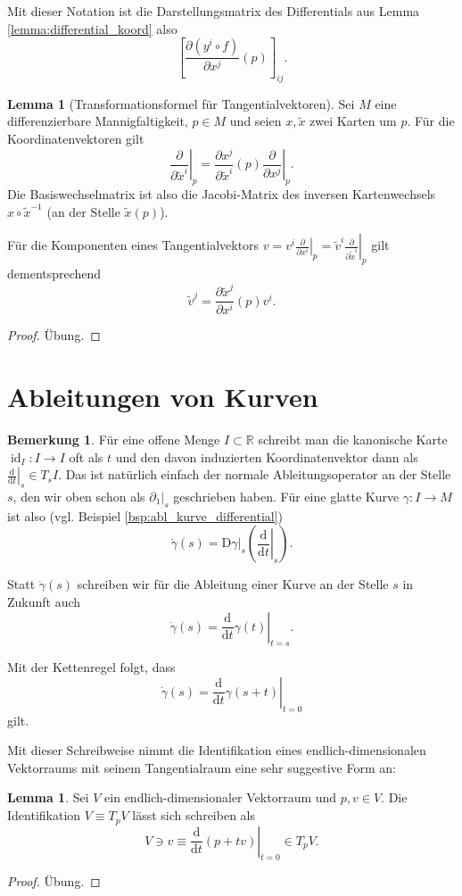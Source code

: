 \documentclass[a4paper]{scrbook}
\numberwithin{equation}{chapter}
\newcommand{\D}{\mathrm{d}}
\newcommand{\DD}{\mathrm{D}}
\DeclareMathOperator{\id}{id}
\theoremstyle{definition}
\newtheorem{lemma}[defn]{Lemma}
\newtheorem{bem}[defn]{Bemerkung}
\newcommand{\bewUeb}{\begin{proof}Übung.\end{proof}}
\begin{document}
Mit dieser Notation ist die Darstellungsmatrix des Differentials aus Lemma \ref{lemma:differential_koord} also
\[\left[\frac{\partial(y^i \circ f)}{\partial x^j}(p)\right]_{ij}.\]

\begin{lemma}[Transformationsformel für Tangentialvektoren]
	Sei $M$ eine differenzierbare Mannigfaltigkeit, $p\in M$ und seien $x, \tilde x$ zwei Karten um $p$. Für die Koordinatenvektoren gilt
	\[\left.\frac{\partial}{\partial \tilde x^i}\right|_p = \frac{\partial x^j}{\partial \tilde x^i}(p) \left.\frac{\partial}{\partial x^j}\right|_p.\]
	Die Basiswechselmatrix ist also die Jacobi-Matrix des inversen Kartenwechsels $x \circ \tilde x^{-1}$ (an der Stelle $\tilde x(p)$).

	Für die Komponenten eines Tangentialvektors $v = v^i \left.\frac{\partial}{\partial x^i}\right|_p = \tilde v^i \left.\frac{\partial}{\partial \tilde x^i}\right|_p$ gilt dementsprechend
	\[\tilde v^j = \frac{\partial \tilde x^j}{\partial x^i}(p) v^i.\]

	\bewUeb
\end{lemma}

\section{Ableitungen von Kurven}
\begin{bem}
	Für eine offene Menge $I\subset\mathbb R$ schreibt man die kanonische Karte $\id_I\colon I \to I$ oft als $t$ und den davon induzierten Koordinatenvektor dann als $\left.\frac{\D}{\D t}\right|_s \in T_sI$. Das ist natürlich einfach der normale Ableitungsoperator an der Stelle $s$, den wir oben schon als $\left.\partial_1\right|_s$ geschrieben haben. Für eine glatte Kurve $\gamma\colon I \to M$ ist also (vgl. Beispiel \ref{bsp:abl_kurve_differential})
	\[\dot\gamma(s) = \left.\DD\gamma\right|_s \left(\left.\frac{\D}{\D t}\right|_s\right).\]

	Statt $\dot\gamma(s)$ schreiben wir für die Ableitung einer Kurve an der Stelle $s$ in Zukunft auch
	\[\dot\gamma(s) = \left.\frac{\D}{\D t}\gamma(t)\right|_{t = s}.\]

	Mit der Kettenregel folgt, dass
	\[\dot\gamma(s) = \left.\frac{\D}{\D t}\gamma(s + t)\right|_{t = 0}\]
	gilt.
\end{bem}
Mit dieser Schreibweise nimmt die Identifikation eines endlich-dimensionalen Vektorraums mit seinem Tangentialraum eine sehr suggestive Form an:
\begin{lemma}
	Sei $V$ ein endlich-dimensionaler Vektorraum und $p, v\in V$. Die Identifikation $V \equiv T_pV$ lässt sich schreiben als
	\[V \ni v \equiv \left.\frac{\D}{\D t}(p + tv)\right|_{t=0} \in T_pV.\]
	\bewUeb
\end{lemma}
\end{document}
